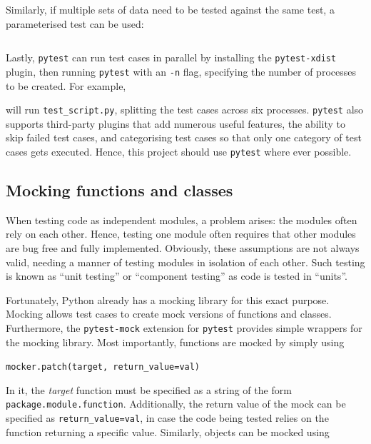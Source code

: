 \documentclass[11pt]{article}
\begin{document}
\noindent
Similarly, if multiple sets of data need to be tested against the same test, a parameterised test can be used:

\inputminted{python}{python_examples/pytest_parameterize.py}

\noindent
Lastly, \texttt{pytest} can run test cases in parallel by installing the \texttt{pytest-xdist} plugin, then running \texttt{pytest} with an \texttt{-n} flag, specifying the number of processes to be created. For example,


\noindent
will run \texttt{test\_script.py}, splitting the test cases across six processes. \texttt{pytest} also supports third-party plugins that add numerous useful features, the ability to skip failed test cases, and categorising test cases so that only one category of test cases gets executed. Hence, this project should use \texttt{pytest} where ever possible.

\subsection{Mocking functions and classes}

When testing code as independent modules, a problem arises: the modules often rely on each other. Hence, testing one module often requires that other modules are bug free and fully implemented. Obviously, these assumptions are not always valid, needing a manner of testing modules in isolation of each other. Such testing is known as ``unit testing'' or ``component testing'' as code is tested in ``units''.

Fortunately, Python already has a mocking library for this exact purpose. Mocking allows test cases to create mock versions of functions and classes. Furthermore, the \texttt{pytest-mock} extension for \texttt{pytest} provides simple wrappers for the mocking library. Most importantly, functions are mocked by simply using

\vspace{\baselineskip}
\texttt{mocker.patch(target, return_value=val)}

\vspace{\baselineskip}

\noindent
In it, the \textit{target} function must be specified as a string of the form \texttt{package.module.function}. Additionally, the return value of the mock can be specified as \texttt{return_value=val}, in case the code being tested relies on the function returning a specific value. Similarly, objects can be mocked using
\end{document}
